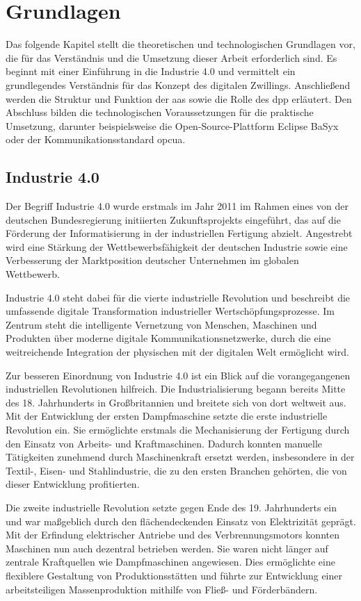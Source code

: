\newpage
\section{Grundlagen}
\label{sec:Grundlagen}
Das folgende Kapitel stellt die theoretischen und technologischen Grundlagen vor, die für das Verständnis und die Umsetzung dieser Arbeit erforderlich sind.
Es beginnt mit einer Einführung in die Industrie 4.0 und vermittelt ein grundlegendes Verständnis für das Konzept des digitalen Zwillings.
Anschließend werden die Struktur und Funktion der \acs{aas} sowie die Rolle des \acs{dpp} erläutert.
Den Abschluss bilden die technologischen Voraussetzungen für die praktische Umsetzung, darunter beispielsweise die Open-Source-Plattform Eclipse BaSyx oder der Kommunikationsstandard \acs{opcua}.
\subsection{Industrie 4.0}

Der Begriff Industrie 4.0 wurde erstmals im Jahr 2011 im Rahmen eines von der deutschen Bundesregierung initiierten Zukunftsprojekts eingeführt, das auf die Förderung der Informatisierung in der industriellen Fertigung abzielt.
Angestrebt wird eine Stärkung der Wettbewerbsfähigkeit der deutschen Industrie sowie eine Verbesserung der Marktposition deutscher Unternehmen im globalen Wettbewerb.

Industrie 4.0 steht dabei für die vierte industrielle Revolution und beschreibt die umfassende digitale Transformation industrieller Wertschöpfungsprozesse. 
Im Zentrum steht die intelligente Vernetzung von Menschen, Maschinen und Produkten über moderne digitale Kommunikationsnetzwerke, durch die eine weitreichende Integration der physischen mit der digitalen Welt ermöglicht wird.

Zur besseren Einordnung von Industrie 4.0 ist ein Blick auf die vorangegangenen industriellen Revolutionen hilfreich.
Die Industrialisierung begann bereits Mitte des 18. Jahrhunderts in Großbritannien und breitete sich von dort weltweit aus. 
Mit der Entwicklung der ersten Dampfmaschine setzte die erste industrielle Revolution ein. 
Sie ermöglichte erstmals die Mechanisierung der Fertigung durch den Einsatz von Arbeits- und Kraftmaschinen. 
Dadurch konnten manuelle Tätigkeiten zunehmend durch Maschinenkraft ersetzt werden, insbesondere in der Textil-, Eisen- und Stahlindustrie, die zu den ersten Branchen gehörten, die von dieser Entwicklung profitierten.

Die zweite industrielle Revolution setzte gegen Ende des 19. Jahrhunderts ein und war maßgeblich durch den flächendeckenden Einsatz von Elektrizität geprägt. 
Mit der Erfindung elektrischer Antriebe und des Verbrennungsmotors konnten Maschinen nun auch dezentral betrieben werden. Sie waren nicht länger auf zentrale Kraftquellen wie Dampfmaschinen angewiesen. 
Dies ermöglichte eine flexiblere Gestaltung von Produktionsstätten und führte zur Entwicklung einer arbeitsteiligen Massenproduktion mithilfe von Fließ- und Förderbändern.

